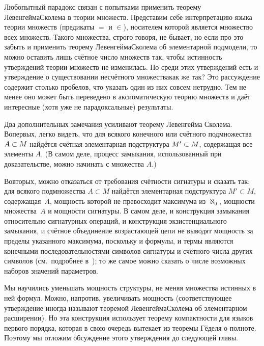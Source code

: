 Любопытный парадокс связан с попытками применить теорему
Левенгейма\ч Сколема в теории множеств. Представим себе
интерпретацию языка теории множеств (предикаты $=$ и $\in$),
носителем которой является множество всех множеств. Такого
множества, строго говоря, не бывает, но если про это забыть и
применить теорему Левенгейма\ч Сколема об элементарной
подмодели, то можно оставить лишь счётное число множеств так,
чтобы истинность утверждений теории множеств не изменилась. Но
среди этих утверждений есть и утверждение о существовании
несчётного множества\т как же так? Это рассуждение содержит
столько пробелов, что указать один из них совсем нетрудно. Тем
не менее оно может быть переведено в аксиоматическую теорию
множеств и даёт интересные (хотя уже не парадоксальные)
результаты.

Два дополнительных замечания усиливают теорему Левенгейма\ч
Сколема. Во\д первых, легко видеть, что для всякого конечного
или счётного подмножества $A\hm\subset M$ найдётся счётная
элементарная подструктура $M'\hm\subset M$, содержащая все
элементы $A$. (В самом деле, процесс замыкания, использованный
при доказательстве, можно начинать с множества $A$.)

Во\д вторых, можно отказаться от требования счётности сигнатуры
и сказать так: для всякого подмножества $A\subset M$ найдётся
элементарная подструктура $M'\subset M$, содержащая~$A$,
мощность которой не превосходит максимума из $\aleph_0$,
мощности множества~$A$ и мощности сигнатуры. В самом деле, и
конструкция замыкания относительно сигнатурных операций, и
конструкция экзистенциального замыкания, и счётное объединение
возрастающей цепи не выводят мощность за пределы указанного
максимума, поскольку и формулы, и термы являются конечными
последовательностями символов сигнатуры и счётного числа других
символов (см.~подробнее в~\cite{naive-set-theory}); то же самое
можно сказать о числе возможных наборов значений параметров.

Мы научились уменьшать мощность структуры, не меняя множества
истинных в ней формул. Можно, напротив, увеличивать мощность
(соответствующее утверждение иногда называют теоремой
Левенгейма\ч Сколема об элементарном расширении). Но эта
конструкция использует теорему компактности для языков первого
порядка, которая в свою очередь вытекает из теоремы Гёделя о
полноте. Поэтому мы отложим обсуждение этого утверждения до
следующей главы.
